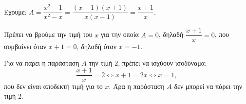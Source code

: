 
\begin{alist}
\item Έχουμε: $A = \dfrac{x^2 - 1}{x^2 - x} = \dfrac{(x - 1)(x + 1)}{x(x - 1)} = \dfrac{x + 1}{x}$.

\item 
\begin{rlist}
\item Πρέπει να βρούμε την τιμή του $x$ για την οποία $A = 0$, δηλαδή $\dfrac{x + 1}{x} = 0$, που συμβαίνει όταν $x + 1 = 0$, δηλαδή όταν $x = -1$.
\item Για να πάρει η παράσταση $A$ την τιμή $2$, πρέπει να ισχύουν ισοδύναμα:
\[\dfrac{x + 1}{x} = 2 \Leftrightarrow x + 1 = 2x \Leftrightarrow x = 1,\]
που δεν είναι αποδεκτή τιμή για το $x$. 
Άρα η παράσταση $A$ δεν μπορεί να πάρει την τιμή $2$.
\end{rlist}
\end{alist}

